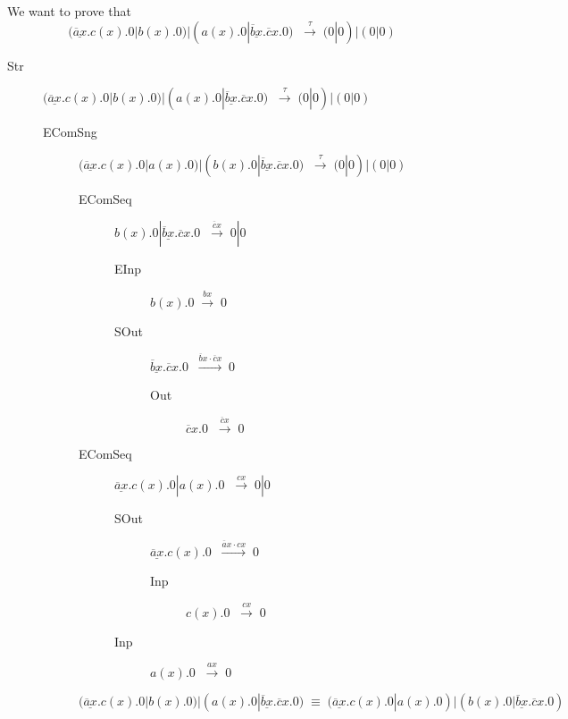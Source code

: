 \begin{example}
  We want to prove that 
  \[
    (\underline{\overline{a}x}.c(x).0|b(x).0)|(a(x).0|\underline{\overline{b}x}.\overline{c}x.0)\;
      \;\xrightarrow{\tau}\; 
	(0|0)|(0|0)
  \]
  \begin{description}
    \item[Str]
      $(\underline{\overline{a}x}.c(x).0|b(x).0)|(a(x).0|\underline{\overline{b}x}.\overline{c}x.0)\;
	\;\xrightarrow{\tau}\; 
	  (0|0)|(0|0)$
      \begin{description}
	\item[EComSng] 
	  $(\underline{\overline{a}x}.c(x).0|a(x).0)|(b(x).0|\underline{\overline{b}x}.\overline{c}x.0)\;
	    \;\xrightarrow{\tau}\;
	      (0|0)|(0|0)$
	  \begin{description}
	    \item[EComSeq]
	      $b(x).0|\underline{\overline{b}x}.\overline{c}x.0\;
		\;\xrightarrow{\overline{c}x}\;
		  0|0$
	      \begin{description}
		\item[EInp]
		  $b(x).0
		    \;\xrightarrow{bx}\;
		      0$
		\item[SOut]
		  $\underline{\overline{b}x}.\overline{c}x.0\;
		    \;\xrightarrow{\overline{b}x\cdot \overline{c}x}\;
		      0$
		  \begin{description}
		    \item[Out]
		      $\overline{c}x.0\;
			\;\xrightarrow{\overline{c}x}\;
			  0$
		  \end{description}
	      \end{description}
	    \item[EComSeq]
	      $\underline{\overline{a}x}.c(x).0|a(x).0\;
		\;\xrightarrow{cx}\;
		  0|0$
	      \begin{description}
		\item[SOut]
		  $\underline{\overline{a}x}.c(x).0\;
		    \;\xrightarrow{\overline{a}x\cdot cx}\;
		      0$
		  \begin{description}
		    \item[Inp]
		      $c(x).0\;
			\;\xrightarrow{cx}\;
			  0$
		  \end{description}
		\item[Inp]
		  $a(x).0\;
		    \;\xrightarrow{ax}\;
		      0$
	      \end{description}
	  \end{description}
	\item[]
	  $(\underline{\overline{a}x}.c(x).0|b(x).0)|(a(x).0|\underline{\overline{b}x}.\overline{c}x.0)\;
	    \equiv\;
	      (\underline{\overline{a}x}.c(x).0|a(x).0)|(b(x).0|\underline{\overline{b}x}.\overline{c}x.0)$
      \end{description}
  \end{description}
\end{example}


